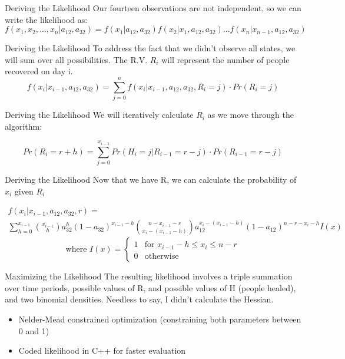 \documentclass[10pt,table]{beamer}
\begin{document}
\begin{frame}{Deriving the Likelihood}
Our fourteen observations are not independent, so we can write the likelihood as: 
$$
f(x_1, x_2,...,x_n| a_{12}, a_{32}) = f(x_1| a_{12}, a_{32}) f(x_2|x_1, a_{12}, a_{32}) ... f(x_n|x_{n-1}, a_{12}, a_{32})
$$
\end{frame}

\begin{frame}{Deriving the Likelihood}
To address the fact that we didn't observe all states, we will sum over all possibilities. The R.V. $R_i$ will represent the number of people recovered on day i.
$$
f(x_i | x_{i-1}, a_{12}, a_{32}) =\sum_{j=0}^n f(x_i | x_{i-1}, a_{12}, a_{32}, R_i=j)\cdot Pr(R_i=j) 
\label{sum}
$$
\end{frame}


\begin{frame}{Deriving the Likelihood}
We will iteratively calculate $R_i$ as we move through the algorithm:

$$
Pr(R_i = r + h) = \sum_{j=0}^{x_{i-1}} Pr(H_i=j|R_{i-1}=r-j)\cdot Pr(R_{i-1}=r-j)
$$
\end{frame}

\begin{frame}{Deriving the Likelihood}
Now that we have R, we can calculate the probability of $x_i$ given $R_i$

\begin{multline*}
f(x_i|x_{i-1}, a_{12}, a_{32}, r) = \\ \sum_{h=0}^{x_{i-1}}       {{x_{i-1}}\choose{h}} a_{32}^h(1-a_{32})^{x_{i-1}-h}  {{n-x_{i-1}-r}\choose{x_i-(x_{i-1}-h)}}  a_{12}^{x_i-(x_{i-1}-h)} (1-a_{12})^{n - r - x_i-h}I(x)  \end{multline*} $$
\text{where } I(x) = \begin{cases} 1 & \text{for } x_{i-1}-h\leq x_i\leq n-r  \\ 0 &\text{otherwise} \end{cases}$$


\end{frame}
\begin{frame}{Maximizing the Likelihood}
The resulting likelihood involves a triple summation over time periods, possible values of R, and possible values of H (people healed), and two binomial densities. Needless to say, I didn't calculate the Hessian. 
\begin{itemize}
\item Nelder-Mead constrained optimization (constraining both parameters between 0 and 1)
\item Coded likelihood in C++ for faster evaluation
\end{itemize}

\end{frame}
\end{document}
